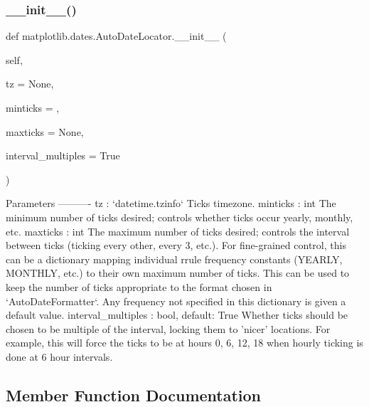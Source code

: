 \subsubsection{\texorpdfstring{\+\_\+\+\_\+init\+\_\+\+\_\+()}{\_\_init\_\_()}}
{\footnotesize\ttfamily def matplotlib.\+dates.\+Auto\+Date\+Locator.\+\_\+\+\_\+init\+\_\+\+\_\+ (\begin{DoxyParamCaption}\item[{}]{self,  }\item[{}]{tz = {\ttfamily None},  }\item[{}]{minticks = {},  }\item[{}]{maxticks = {\ttfamily None},  }\item[{}]{interval\+\_\+multiples = {\ttfamily True} }\end{DoxyParamCaption})}

\begin{DoxyVerb}Parameters
----------
tz : `datetime.tzinfo`
    Ticks timezone.
minticks : int
    The minimum number of ticks desired; controls whether ticks occur
    yearly, monthly, etc.
maxticks : int
    The maximum number of ticks desired; controls the interval between
    ticks (ticking every other, every 3, etc.).  For fine-grained
    control, this can be a dictionary mapping individual rrule
    frequency constants (YEARLY, MONTHLY, etc.) to their own maximum
    number of ticks.  This can be used to keep the number of ticks
    appropriate to the format chosen in `AutoDateFormatter`. Any
    frequency not specified in this dictionary is given a default
    value.
interval_multiples : bool, default: True
    Whether ticks should be chosen to be multiple of the interval,
    locking them to 'nicer' locations.  For example, this will force
    the ticks to be at hours 0, 6, 12, 18 when hourly ticking is done
    at 6 hour intervals.
\end{DoxyVerb}
 

\subsection{Member Function Documentation}
\mbox{\label{classmatplotlib_1_1dates_1_1AutoDateLocator_a97ef3f072d16af63adf1ac26e26a436e}} 
